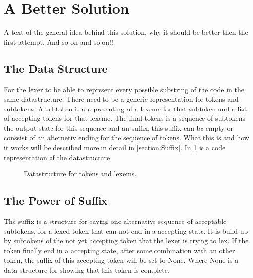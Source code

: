 \section{A Better Solution} %
A text of the general idea behind this solution, why it should be better then the first attempt. And so on and so on!!

\subsection{The Data Structure}
For the lexer to be able to represent every possible substring of the code in the same datastructure. There need to be a generic representation for tokens and subtokens. A subtoken is a representing of a lexeme for that subtoken and a list of accepting tokens for that lexeme. The final tokens is a sequence of subtokens the output state for this sequence and an suffix, this suffix can be empty or conssist of an alternetiv ending for the sequence of tokens. What this is and how it works will be described more in detail in \cref{section:Suffix}.
In \cref{fig:DataStruct} is a code representation of the datastructure

\begin{figure}[h!]
  \centering
  
  \caption{Datastructure for tokens and lexems. 
  \label{fig:DataStruct}}
\end{figure} 

\subsection{The Power of Suffix
\label{section:Suffix}}
The suffix is a structure for saving one alternative sequence of acceptable subtokens, for a lexed token that can not end in a accepting state. It is build up by subtokens of the not yet accepting token that the lexer is trying to lex. If the token finally end in a accepting state, after some combination with an other token, the suffix of this accepting token will be set to None. Where None is a data-structure for showing that this token is complete. 

